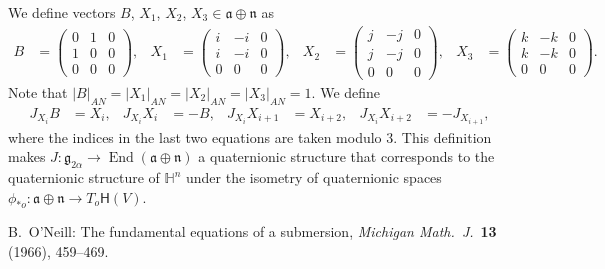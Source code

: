 \documentclass[12pt, a4paper]{amsart}
\newcommand{\g}{\mathfrak}
\renewcommand{\H}{\mathbb{H}}
\theoremstyle{remark}
\begin{document}
We define vectors $B$, $X_{1}$, $X_{2}$, $X_{3}\in\g{a}\oplus \g{n}$ as
\[
\begin{aligned}
B
&{}=\left(
\begin{array}{cc|c}
	0 & 1 & 0 \\
	1 & 0 & 0 \\
	\hline
	0 & 0 & 0
\end{array}
\right),&
X_{1}
&{}=\left(
\begin{array}{cc|c}
i & -i & 0 \\
i & -i & 0 \\
\hline
0 & 0 & 0
\end{array}
\right),&
X_{2}
&{}=\left(
\begin{array}{cc|c}
j & -j & 0 \\
j & -j & 0 \\
\hline
0 & 0 & 0
\end{array}
\right),&
X_{3}
&{}=\left(
\begin{array}{cc|c}
k & -k & 0 \\
k & -k & 0 \\
\hline
0 & 0 & 0
\end{array}
\right).
\end{aligned}
\]
Note that $\lvert B\rvert_{AN}=\lvert X_1\rvert_{AN}=\lvert X_2\rvert_{AN}=\lvert X_3\rvert_{AN}=1$.
We define
\[
\begin{aligned}
J_{X_{i}}B&{}=X_{i},&
J_{X_{i}}X_{i}&{}=-B,&
J_{X_{i}}X_{i+1}&{}=X_{i+2},&
J_{X_{i}}X_{i+2}&{}=-J_{X_{i+1}},
\end{aligned}
\]
where the indices in the last two equations are taken modulo $3$.
This definition makes $J\colon\g{g}_{2\alpha}\to\operatorname{End}(\g{a}\oplus\g{n})$ a quaternionic structure that corresponds to the quaternionic structure of $\H^n$ under the isometry of quaternionic spaces $\phi_{*o}\colon\g{a}\oplus\g{n}\to T_o\mathsf{H}(V)$.
	


\begin{thebibliography}{99}
B.~O'Neill: The fundamental equations of a submersion, \textit{Michigan Math.\ J.}\ \textbf{13} (1966), 459--469.
\end{thebibliography}
\end{document}
